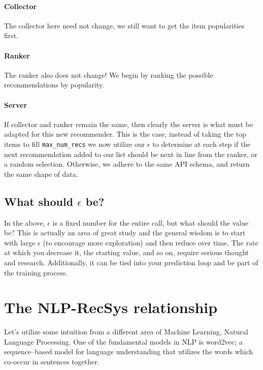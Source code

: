\paragraph{Collector}

The collector here need not change, we still want to get the item popularities first.

\paragraph{Ranker}

The ranker also does not change! We begin by ranking the possible recommendations by popularity.

\paragraph{Server}

If collector and ranker remain the same, then clearly the server is what must be adapted for this new recommender. This is the case, instead of taking the top items to fill \lstinline{max_num_recs} we now utilize our $\epsilon$ to determine at each step if the next recommendation added to our list should be next in line from the ranker, or a random selection. Otherwise, we adhere to the same API schema, and return the same shape of data.

\subsection{What should $\epsilon$ be?}

In the above, $\epsilon$ is a fixed number for the entire call, but what should the value be? This is actually an area of great study and the general wisdom is to start with large $\epsilon$ (to encourage more exploration) and then reduce over time. The rate at which you decrease it, the starting value, and so on, require serious thought and research. Additionally, it can be tied into your prediction loop and be part of the training process.

\section{The NLP-RecSys relationship}

Let's utilize some intuition from a different area of Machine Learning, Natural Language Processing. One of the fundamental models in NLP is word2vec; a sequence–based model for language understanding that utilizes the words which co-occur in sentences together. 

